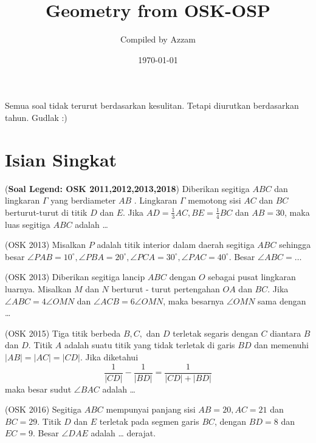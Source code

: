 \documentclass[11pt]{scrartcl}
\begin{document}
	\title{Geometry from OSK-OSP} %
	\date{\today}
	\author{Compiled by Azzam}
	\maketitle
	Semua soal tidak terurut berdasarkan kesulitan.
	Tetapi diurutkan berdasarkan tahun.
	Gudlak :)
	\section{Isian Singkat}
	
	\begin{soalbaru}(\textbf{Soal Legend: OSK 2011,2012,2013,2018}) Diberikan segitiga $ABC$ dan lingkaran $\Gamma$ yang berdiameter $AB$ . Lingkaran $\Gamma$ memotong sisi $AC$ dan $BC$
berturut-turut di titik $D$ dan $E$. Jika $AD = \frac13 AC, BE =\frac14 BC$ dan $AB = 30$, maka luas segitiga $ABC$ adalah \dots
	
	\end{soalbaru}
	
	\begin{soalbaru}
	(OSK 2013) Misalkan $P$ adalah titik interior dalam daerah segitiga $ABC$ sehingga besar $\angle PAB = 10^\circ, \angle PBA = 20^\circ, \angle PCA = 30^\circ, \angle PAC = 40^\circ$. Besar $\angle ABC = \dots$
	\end{soalbaru}
	
	\begin{soalbaru}
	(OSK 2013) Diberikan segitiga lancip $ABC$ dengan $O$ sebagai pusat lingkaran luarnya. Misalkan $M$ dan $N$
berturut - turut pertengahan $OA$ dan $BC$. Jika $\angle ABC = 4\angle OMN$ dan $\angle ACB = 6\angle OMN$,
maka besarnya $\angle OMN$ sama dengan \dots
	\end{soalbaru}
	\begin{soalbaru}(OSK 2015)
	Tiga titik berbeda $B, C,$ dan $D$ terletak segaris dengan $C$ diantara $B$ dan $D$. Titik $A$ adalah suatu
titik yang tidak terletak di garis $BD$ dan memenuhi $|AB| = |AC| = |CD|$. Jika diketahui
$$\dfrac{1}{|CD|}-\dfrac{1}{|BD|}=\dfrac{1}{|CD|+|BD|}$$
maka besar sudut $\angle BAC$ adalah \dots
	\end{soalbaru}
	
	\begin{soalbaru}
	(OSK 2016) Segitiga $ABC$ mempunyai panjang sisi $AB = 20, AC = 21$ dan $ BC = 29$. Titik $D$ dan $ E$
terletak pada segmen garis $BC$, dengan $BD = 8$ dan $EC = 9$. Besar $\angle DAE$ adalah \dots
derajat.
	\end{soalbaru}
	
\end{document}
